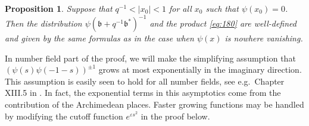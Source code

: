 \documentclass[14pt]{extarticle}
\newcommand{\fb}{\mathfrak{b}}
\newtheorem{Proposition}[Lemma]{Proposition}
\theoremstyle{definition}
\begin{document}
\subsubsection{}

\begin{Proposition}\label{p_convolve}
Suppose that $q^{-1} < |x_0| < 1$ for all $x_0$ such that
$\psi(x_0)=0$. Then the distribution $\psi(\fb+q^{-1} \fb^*)^{-1}$ and the product
\eqref{eq:180} are well-defined and given by the same formulas
as in the case when $\psi(x)$ is nowhere vanishing. 
\end{Proposition}

\noindent
In number field part of the proof, we will make the simplifying assumption that
$(\psi(s)\psi(-1-s))^{\pm 1}$ grows at most exponentially in the
imaginary direction. This assumption is easily seen to hold for all
number fields, see e.g.\ Chapter XIII.5 in \cite{Lang}. In fact, the
exponential terms in this asymptotics come from the contribution of
the Archimedean places. Faster growing
  functions may be handled by modifying the
  cutoff function $e^{\varepsilon s^2}$ in the proof below. 
\end{document}
